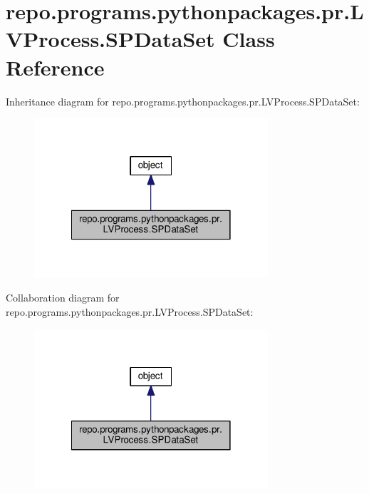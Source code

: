 \hypertarget{classrepo_1_1programs_1_1pythonpackages_1_1pr_1_1LVProcess_1_1SPDataSet}{\section{repo.\-programs.\-pythonpackages.\-pr.\-L\-V\-Process.\-S\-P\-Data\-Set Class Reference}
\label{classrepo_1_1programs_1_1pythonpackages_1_1pr_1_1LVProcess_1_1SPDataSet}
}


Inheritance diagram for repo.\-programs.\-pythonpackages.\-pr.\-L\-V\-Process.\-S\-P\-Data\-Set\-:
\nopagebreak
\begin{figure}[H]
\begin{center}
\leavevmode
\includegraphics[width=246pt]{classrepo_1_1programs_1_1pythonpackages_1_1pr_1_1LVProcess_1_1SPDataSet__inherit__graph}
\end{center}
\end{figure}


Collaboration diagram for repo.\-programs.\-pythonpackages.\-pr.\-L\-V\-Process.\-S\-P\-Data\-Set\-:
\nopagebreak
\begin{figure}[H]
\begin{center}
\leavevmode
\includegraphics[width=246pt]{classrepo_1_1programs_1_1pythonpackages_1_1pr_1_1LVProcess_1_1SPDataSet__coll__graph}
\end{center}
\end{figure}
